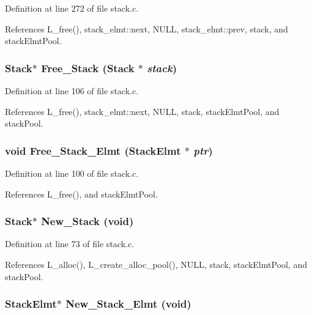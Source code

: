 Definition at line 272 of file stack.c.

References L\_\-free(), stack\_\-elmt::next, NULL, stack\_\-elmt::prev, stack, and stack\-Elmt\-Pool.
\subsubsection{\setlength{\rightskip}{0pt plus 5cm}\bf{Stack}$\ast$ Free\_\-Stack (\bf{Stack} $\ast$ {\em stack})}\label{stack_8h_75dc5a1eb36f56f194c6d77a744bd7b9}




Definition at line 106 of file stack.c.

References L\_\-free(), stack\_\-elmt::next, NULL, stack, stack\-Elmt\-Pool, and stack\-Pool.
\subsubsection{\setlength{\rightskip}{0pt plus 5cm}void Free\_\-Stack\_\-Elmt (\bf{Stack\-Elmt} $\ast$ {\em ptr})}\label{stack_8h_1a1138d66f29f2c5d0ae49fc95355104}




Definition at line 100 of file stack.c.

References L\_\-free(), and stack\-Elmt\-Pool.
\subsubsection{\setlength{\rightskip}{0pt plus 5cm}\bf{Stack}$\ast$ New\_\-Stack (void)}\label{stack_8h_2a25d0256b96282a3446a9f24e83e07d}




Definition at line 73 of file stack.c.

References L\_\-alloc(), L\_\-create\_\-alloc\_\-pool(), NULL, stack, stack\-Elmt\-Pool, and stack\-Pool.
\subsubsection{\setlength{\rightskip}{0pt plus 5cm}\bf{Stack\-Elmt}$\ast$ New\_\-Stack\_\-Elmt (void)}\label{stack_8h_d89e20eb985b29959a68376e1a7b5402}




